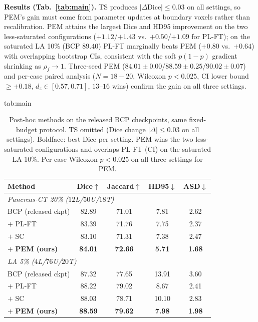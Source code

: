 \documentclass{midl}
\begin{document}
\noindent\textbf{Results (Tab.~\ref{tab:main}).}
TS produces $|\Delta\mathrm{Dice}|{\le}0.03$ on all settings, so PEM's gain must come from parameter updates at boundary voxels rather than recalibration.
PEM attains the largest Dice and HD95 improvement on the two less-saturated configurations ($+1.12$/$+1.43$ vs.\ $+0.50$/$+1.09$ for PL-FT); on the saturated LA 10\% (BCP $89.40$) PL-FT marginally beats PEM ($+0.80$ vs.\ $+0.64$) with overlapping bootstrap CIs, consistent with the soft $p(1{-}p)$ gradient shrinking as $\rho_f\!\to\!1$.
Three-seed PEM ($84.01{\pm}0.00$/$88.59{\pm}0.25$/$90.02{\pm}0.07$) and per-case paired analysis ($N{=}18{-}20$, Wilcoxon $p{<}0.025$, CI lower bound $\geq{+}0.18$, $d_z{\in}[0.57,0.71]$, $13$--$16$ wins) confirm the gain on all three settings.

\begin{table}[htbp]
\floatconts
  {tab:main}
  {\caption{Post-hoc methods on the released BCP checkpoints, same fixed-budget protocol. TS omitted (Dice change $|\Delta|{\le}0.03$ on all settings). Boldface: best Dice per setting. PEM wins the two less-saturated configurations and overlaps PL-FT (CI) on the saturated LA 10\%. Per-case Wilcoxon $p{<}0.025$ on all three settings for PEM.}}
  {\footnotesize
  \setlength{\tabcolsep}{3.5pt}
  \begin{tabular}{lcccc}
  \toprule
  \textbf{Method} & \textbf{Dice}$\uparrow$ & \textbf{Jaccard}$\uparrow$ & \textbf{HD95}$\downarrow$ & \textbf{ASD}$\downarrow$ \\
  \midrule
  \multicolumn{5}{l}{\textit{Pancreas-CT 20\% \;($12$L/$50$U/$18$T)}} \\
  BCP (released ckpt)       & 82.89 & 71.01 &  7.81 & 2.62 \\
  \;\;$+$ PL-FT             & 83.39 & 71.76 &  7.75 & 2.37 \\
  \;\;$+$ SC                & 83.10 & 71.31 &  7.38 & 2.47 \\
  \;\;$+$ \textbf{PEM (ours)} & \textbf{84.01} & \textbf{72.66} & \textbf{5.71} & \textbf{1.68} \\
  \midrule
  \multicolumn{5}{l}{\textit{LA 5\% \;($4$L/$76$U/$20$T)}} \\
  BCP (released ckpt)         & 87.32 & 77.65 & 13.91 & 3.60 \\
  \;\;$+$ PL-FT               & 88.22 & 79.02 &  8.67 & 2.41 \\
  \;\;$+$ SC                  & 88.03 & 78.71 & 10.10 & 2.83 \\
  \;\;$+$ \textbf{PEM (ours)} & \textbf{88.59} & \textbf{79.62} & \textbf{7.98} & \textbf{1.98} \\

\end{tabular}}
\end{table}
\end{document}
